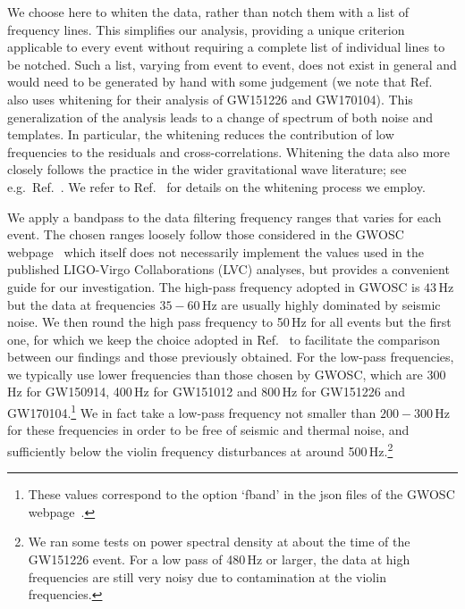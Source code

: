 \documentclass[a4paper,11pt]{article}
\newcommand{\gn}[2]{#2}
\begin{document}
We choose here to whiten the data, rather than notch them with a list of frequency lines.
This simplifies our analysis, providing a unique criterion applicable to every event without requiring a complete list of individual lines to be notched. Such a list, varying from event to event, does not exist in general and would need to be generated by hand with some judgement
(we note that Ref.~\cite{Creswell:2017rbh} also uses whitening for their analysis of GW151226 and GW170104). This generalization of the analysis leads to a change of spectrum of both noise and templates.
In particular, the whitening reduces the contribution of low
frequencies to the residuals and cross-correlations. Whitening the data also more closely follows the practice in the wider gravitational wave 
literature; see e.g.~Ref.~\cite{LIGOScientific:2019hgc}. We refer to Ref.~\cite{Nielsen:2018bhc} for details on the whitening process we employ.  


We apply a bandpass to the data filtering frequency ranges that varies for each event.  The chosen ranges loosely follow those considered in the GWOSC webpage~\cite{Vallisneri:2014vxa} which itself does not necessarily implement the values used in the published LIGO-Virgo Collaborations (LVC) analyses, but provides a convenient guide for our investigation.
The high-pass frequency adopted in GWOSC is $43$\,Hz but the data at  frequencies $35-60$\,Hz are usually highly dominated by seismic noise. We then round the high pass frequency to 50\,Hz for all events but the first one, for which we keep the choice adopted in Ref.~\cite{Nielsen:2018bhc} to facilitate the comparison between our findings and those previously obtained.
For the low-pass frequencies, we typically use \gn{larger}{lower} frequencies than those chosen by GWOSC, which are 300\,Hz for GW150914, 400\,Hz for GW151012 and 800\,Hz for GW151226 and GW170104.\footnote{These values correspond to the option `fband' in the json files of the GWOSC webpage~\cite{Vallisneri:2014vxa}.} 
We in fact take a low-pass frequency not smaller than 
$200-300$\,Hz for these frequencies in order to be free of seismic and thermal noise, and sufficiently below the violin frequency disturbances at around 500\,Hz.\footnote{We ran some tests on power spectral density at about the time of the GW151226 event. For a low pass of 480\,Hz or larger, the data at high frequencies are still very noisy due to contamination at the violin frequencies.}
\end{document}
